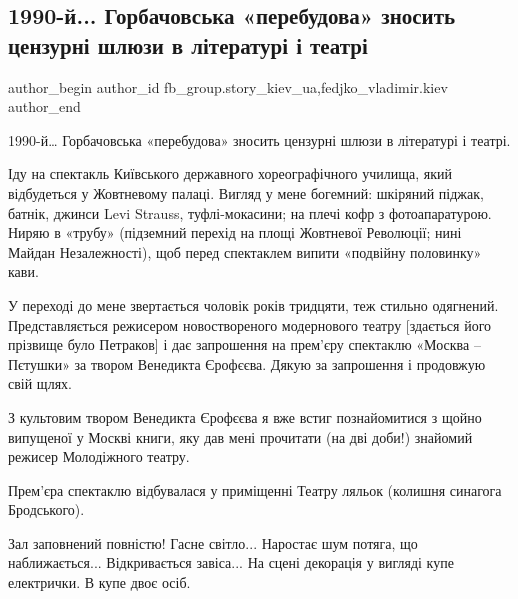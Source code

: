  
 
 
 
 
 
\subsection{1990-й... Горбачовська «перебудова» зносить цензурні шлюзи в літературі і театрі}
\label{sec:23_11_2021.fb.fb_group.story_kiev_ua.1.1990_gorbachev_perestrojka_literatura_teatr}
 
\ifcmt
 author_begin
   author_id fb_group.story_kiev_ua,fedjko_vladimir.kiev
 author_end
\fi

1990-й… Горбачовська «перебудова» зносить цензурні шлюзи в літературі і театрі. 

Іду на спектакль Київського державного хореографічного училища, який
відбудеться у Жовтневому палаці. Вигляд у мене богемний: шкіряний піджак,
батнік, джинси Levi Strauss, туфлі-мокасини; на плечі кофр з фотоапаратурою.
Ниряю в «трубу» (підземний перехід на площі Жовтневої Революції; нині Майдан
Незалежності), щоб перед спектаклем випити «подвійну половинку» кави.

У переході до мене звертається чоловік років тридцяти, теж стильно одягнений.
Представляється режисером новоствореного модернового театру [здається його
прізвище було Петраков] і дає запрошення на прем’єру спектаклю «Москва –
Пєтушки» за твором Венедикта Єрофєєва. Дякую за запрошення і продовжую свій
щлях.

З культовим твором Венедикта Єрофєєва я вже встиг познайомитися з щойно
випущеної у Москві книги, яку дав мені прочитати (на дві доби!) знайомий
режисер Молодіжного театру.

Прем’єра спектаклю відбувалася у приміщенні Театру ляльок (колишня синагога
Бродського). 

Зал заповнений повністю! Гасне світло... Наростає шум потяга, що наближається...
Відкривається завіса... На сцені декорація у вигляді купе електрички. В купе двоє
осіб.


